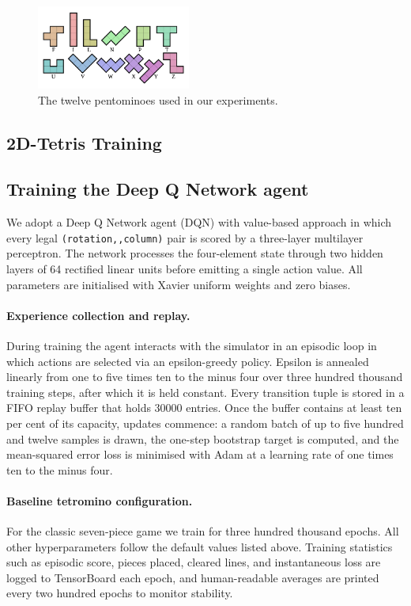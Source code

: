 \begin{figure}
    \centering
    \includegraphics[width=0.45\textwidth]{media/pentomino.png}
    \caption{The twelve pentominoes used in our experiments.}
    \label{fig:pentominoes}
\end{figure}


\subsection{2D-Tetris Training}

\subsection{Training the Deep Q Network agent}

We adopt a Deep Q Network agent (DQN) with value-based approach in which every legal \texttt{(rotation,,column)} pair is scored by a three-layer multilayer perceptron.  The network processes the four-element state through two hidden layers of 64 rectified linear units before emitting a single action value.  All parameters are initialised with Xavier uniform weights and zero biases.

\paragraph{Experience collection and replay.}
During training the agent interacts with the simulator in an episodic loop in which actions are selected via an epsilon-greedy policy. Epsilon is annealed linearly from one to five times ten to the minus four over three hundred thousand training steps, after which it is held constant.  Every transition tuple is stored in a FIFO replay buffer that holds 30000 entries.  Once the buffer contains at least ten per cent of its capacity, updates commence: a random batch of up to five hundred and twelve samples is drawn, the one-step bootstrap target is computed, and the mean-squared error loss is minimised with Adam at a learning rate of one times ten to the minus four.

\paragraph{Baseline tetromino configuration.}
For the classic seven-piece game we train for three hundred thousand epochs.  All other hyperparameters follow the default values listed above.  Training statistics such as episodic score, pieces placed, cleared lines, and instantaneous loss are logged to TensorBoard each epoch, and human-readable averages are printed every two hundred epochs to monitor stability.

